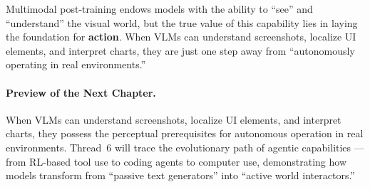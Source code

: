Multimodal post-training endows models with the ability to ``see'' and ``understand'' the visual world,
but the true value of this capability lies in laying the foundation for \textbf{action}.
When VLMs can understand screenshots, localize UI elements, and interpret charts,
they are just one step away from ``autonomously operating in real environments.''

\paragraph{Preview of the Next Chapter.}
When VLMs can understand screenshots, localize UI elements, and interpret charts,
they possess the perceptual prerequisites for autonomous operation in real environments.
Thread~6 will trace the evolutionary path of agentic capabilities ---
from RL-based tool use to coding agents to computer use,
demonstrating how models transform from ``passive text generators'' into ``active world interactors.''
